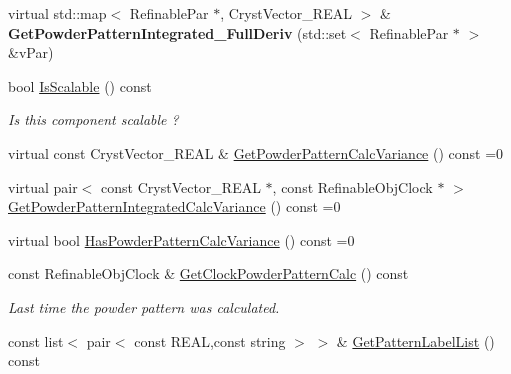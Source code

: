 \begin{DoxyCompactItemize}
\item 
\mbox{\label{class_obj_cryst_1_1_powder_pattern_component_aad1d993918186ced0a9437048051f3c5}} 
virtual std\+::map$<$ Refinable\+Par $\ast$, Cryst\+Vector\+\_\+\+R\+E\+AL $>$ \& {\bfseries Get\+Powder\+Pattern\+Integrated\+\_\+\+Full\+Deriv} (std\+::set$<$ Refinable\+Par $\ast$ $>$ \&v\+Par)
\item 
bool \mbox{\hyperlink{class_obj_cryst_1_1_powder_pattern_component_a28b3e3cbbd4bc064893e8407b922bc6c}{Is\+Scalable}} () const
\begin{DoxyCompactList}\small\item\em Is this component scalable ? \end{DoxyCompactList}\item 
virtual const Cryst\+Vector\+\_\+\+R\+E\+AL \& \mbox{\hyperlink{class_obj_cryst_1_1_powder_pattern_component_ad67b39669fd0d336b01937ee81a59ddc}{Get\+Powder\+Pattern\+Calc\+Variance}} () const =0
\item 
virtual pair$<$ const Cryst\+Vector\+\_\+\+R\+E\+AL $\ast$, const Refinable\+Obj\+Clock $\ast$ $>$ \mbox{\hyperlink{class_obj_cryst_1_1_powder_pattern_component_ae721bd290b50aa9503bac419616a21c6}{Get\+Powder\+Pattern\+Integrated\+Calc\+Variance}} () const =0
\item 
virtual bool \mbox{\hyperlink{class_obj_cryst_1_1_powder_pattern_component_a773d077df9d066f3d15631ec84ca15fd}{Has\+Powder\+Pattern\+Calc\+Variance}} () const =0
\item 
\mbox{\label{class_obj_cryst_1_1_powder_pattern_component_ad246675cb640b58f1b790e26039ab507}} 
const Refinable\+Obj\+Clock \& \mbox{\hyperlink{class_obj_cryst_1_1_powder_pattern_component_ad246675cb640b58f1b790e26039ab507}{Get\+Clock\+Powder\+Pattern\+Calc}} () const
\begin{DoxyCompactList}\small\item\em Last time the powder pattern was calculated. \end{DoxyCompactList}\item 
const list$<$ pair$<$ const R\+E\+AL,const string $>$ $>$ \& \mbox{\hyperlink{class_obj_cryst_1_1_powder_pattern_component_af96a48a4f92609072bd42d6c53549c45}{Get\+Pattern\+Label\+List}} () const
\end{DoxyCompactItemize}
